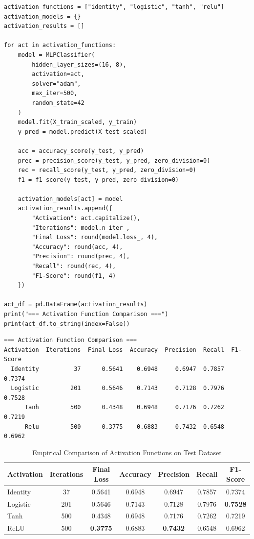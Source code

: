 \documentclass[12pt]{article}
\begin{document}
\begin{lstlisting}[style=code, caption={Activation Function Benchmark Implementation}]
activation_functions = ["identity", "logistic", "tanh", "relu"]
activation_models = {}
activation_results = []

for act in activation_functions:
    model = MLPClassifier(
        hidden_layer_sizes=(16, 8),
        activation=act,
        solver="adam",
        max_iter=500,
        random_state=42
    )
    model.fit(X_train_scaled, y_train)
    y_pred = model.predict(X_test_scaled)
    
    acc = accuracy_score(y_test, y_pred)
    prec = precision_score(y_test, y_pred, zero_division=0)
    rec = recall_score(y_test, y_pred, zero_division=0)
    f1 = f1_score(y_test, y_pred, zero_division=0)
    
    activation_models[act] = model
    activation_results.append({
        "Activation": act.capitalize(),
        "Iterations": model.n_iter_,
        "Final Loss": round(model.loss_, 4),
        "Accuracy": round(acc, 4),
        "Precision": round(prec, 4),
        "Recall": round(rec, 4),
        "F1-Score": round(f1, 4)
    })

act_df = pd.DataFrame(activation_results)
print("=== Activation Function Comparison ===")
print(act_df.to_string(index=False))
\end{lstlisting}

\begin{lstlisting}[style=output, caption={Activation Function Comparison Output}]
=== Activation Function Comparison ===
Activation  Iterations  Final Loss  Accuracy  Precision  Recall  F1-Score
  Identity          37      0.5641    0.6948     0.6947  0.7857    0.7374
  Logistic         201      0.5646    0.7143     0.7128  0.7976    0.7528
      Tanh         500      0.4348    0.6948     0.7176  0.7262    0.7219
      Relu         500      0.3775    0.6883     0.7432  0.6548    0.6962
\end{lstlisting}

\begin{table}[H]
\centering
\caption{Empirical Comparison of Activation Functions on Test Dataset}
\vspace{0.2cm}
\begin{tabular}{lcccccc}
\toprule
\textbf{Activation} & \textbf{Iterations} & \textbf{Final Loss} & \textbf{Accuracy} & \textbf{Precision} & \textbf{Recall} & \textbf{F1-Score} \\
\midrule
Identity & 37 & 0.5641 & 0.6948 & 0.6947 & 0.7857 & 0.7374 \\
Logistic & 201 & 0.5646 & 0.7143 & 0.7128 & 0.7976 & \textbf{0.7528} \\
Tanh     & 500 & 0.4348 & 0.6948 & 0.7176 & 0.7262 & 0.7219 \\
ReLU     & 500 & \textbf{0.3775} & 0.6883 & \textbf{0.7432} & 0.6548 & 0.6962 \\
\bottomrule
\end{tabular}
\end{table}
\end{document}
